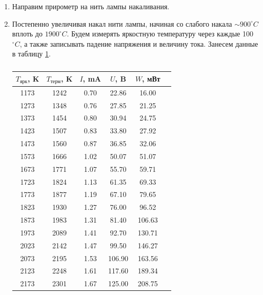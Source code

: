 \documentclass[a4paper]{article}
\begin{document}
\begin{enumerate}
    \item Направим прирометр на нить лампы накаливания.
    
    \item Постепенно увеличивая накал нити лампы, начиная со слабого накала $\sim  900 ^{\circ} C$ вплоть до $1900 ^{\circ} C$. 
    Будем измерять яркостную температуру через каждые 100 $^{\circ} C$, а также записывать падение напряжения и величину тока. 
    Занесем данные в таблицу \ref{t1}. 
    \begin{table}[h]
        \centering
        \caption{}
        \label{t1}
        \begin{tabular}{|c|c|c|c|c|c|}
            \hline
           $T_{\text{ярк}}$, K & $T_{\text{терм}}$, K & $I$, mA & $U$, B & $W$, мВт \\\hline \hline
            1173 & 1242 & 0.70 & 22.86 & 16.00 \\ \hline
            1273 & 1348 & 0.76 & 27.85 & 21.25 \\\hline
            1373 & 1454 & 0.80 & 30.94 & 24.75 \\\hline
            1423 & 1507 & 0.83 & 33.80 & 27.92 \\\hline
            1473 & 1560 & 0.87 & 36.85 & 32.06 \\\hline
            1573 & 1666 & 1.02 & 50.07 & 51.07 \\\hline
            1673 & 1771 & 1.07 & 55.70 & 59.71 \\\hline
            1723 & 1824 & 1.13 & 61.35 & 69.33 \\\hline
            1773 & 1877 & 1.19 & 67.10 & 79.65 \\\hline
            1823 & 1930 & 1.27 & 76.00 & 96.52 \\\hline
            1873 & 1983 & 1.31 & 81.40 & 106.63 \\\hline
            1973 & 2089 & 1.41 & 92.70 & 130.71 \\\hline
            2023 & 2142 & 1.47 & 99.50 & 146.27 \\\hline
            2073 & 2195 & 1.53 & 106.90 & 163.56 \\\hline
            2123 & 2248 & 1.61 & 117.60 & 189.34 \\\hline
            2173 & 2301 & 1.67 & 125.00 & 208.75 \\\hline
        \end{tabular}
    \end{table}


\end{enumerate}
\end{document}
